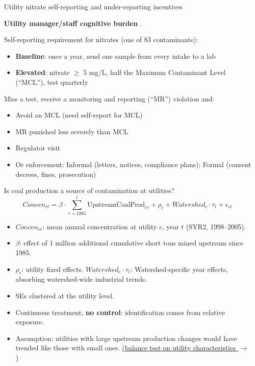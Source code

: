 \documentclass{beamer}
\newcommand{\backuplink}[2]{\hyperlink{#1}{\footnotesize(#2 $\rightarrow$)}}
\begin{document}
\begin{frame}{Utility nitrate self-reporting and under-reporting incentives}

\textbf{Utility manager/staff cognitive burden} \parencite{oleckno1982national}.

Self-reporting requirement for nitrates (one of 83 contaminants):
    \begin{itemize}
        \item \textbf{Baseline}: once a year, send one sample from every intake to a lab
        \item \textbf{Elevated}: nitrate $\geq$ 5 mg/L, half the Maximum Contaminant Level (``MCL''), test quarterly
    \end{itemize}

Miss a test, receive a monitoring and reporting (``MR'') violation and:

\begin{itemize}
    \item Avoid an MCL (need self-report for MCL)
    \item MR punished less severely than MCL
    \item Regulator visit
    \item Or enforcement: Informal (letters, notices, compliance plans); Formal (consent decrees, fines, prosecution)
\end{itemize}
\end{frame}





\begin{frame}{Is coal production a source of contamination at utilities?}
\begin{equation*}
\textit{Concen}_{ct}= \beta\cdot\!\!\sum_{\tau=1985}^{t}\!\!\text{UpstreamCoalProd}_{c\tau} + \rho_c + Watershed_c\cdot\tau_t + \epsilon_{ct}
\end{equation*}
\begin{itemize}\small
    \item $\textit{Concen}_{ct}$: mean annual concentration at utility $c$, year $t$ (SYR2, 1998--2005).
    \item $\beta$: effect of 1 million additional cumulative short tons mined upstream since 1985.
    \item $\rho_c$: utility fixed effects. $Watershed_c\cdot\tau_t$: Watershed-specific year effects, absorbing watershed-wide industrial trends.
    \item SEs clustered at the utility level.
\end{itemize}
\medskip
\begin{itemize}
    \item Continuous treatment, \textbf{no control}: identification comes from relative exposure.
    \item Assumption: utilities with large upstream production changes would have trended like those with small ones. \backuplink{balancetest}{balance test on utility characteristics}
\end{itemize}
\end{frame}
\end{document}
